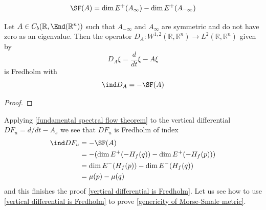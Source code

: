 \[ \SF(A) = \dim E^+(A_\infty) - \dim E^+(A_{-\infty}) \]
\begin{prop}
\label{fundamental spectral flow theorem}
Let $A \in C_b(\mathbb R,\End(\mathbb R^n))$ such that $A_{-\infty}$ and $A_{\infty}$ are symmetric and do not have zero as an eigenvalue. Then the operator $D_A : W^{1,2}(\mathbb R,\mathbb R^n) \rightarrow L^2(\mathbb R,\mathbb R^n)$ given by
\[ D_A \xi = \frac{d}{dt} \xi - A \xi \]
is Fredholm with
\[ \ind D_A = -\SF(A) \]
\end{prop}
\begin{proof}
\end{proof}

Applying \cref{fundamental spectral flow theorem} to the vertical differential $DF_u = d/dt - A_s$ we see that $DF_u$ is Fredholm of index
\begin{align*}
	\ind DF_u &= -\SF(A) \\
	          &= -(\dim E^+(-H_f(q)) - \dim E^+(-H_f(p))) \\
	          &= \dim E^-(H_f(p)) - \dim E^-(H_f(q)) \\
	          &= \mu(p)-\mu(q)
\end{align*}
and this finishes the proof \cref{vertical differential is Fredholm}. Let us see how to use \cref{vertical differential is Fredholm} to prove \cref{genericity of Morse-Smale metric}. 

